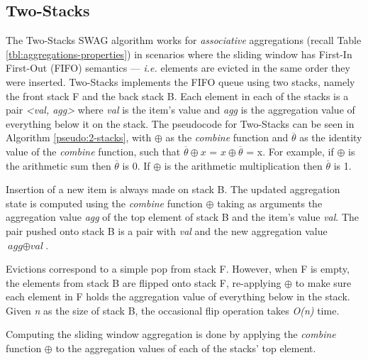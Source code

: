 \subsection{Two-Stacks} \label{sec:2stacks}
The Two-Stacks SWAG algorithm works for \textit{associative} aggregations (recall Table \ref{tbl:aggregations-properties}) in scenarios where the sliding window has First-In First-Out (FIFO) semantics --- \textit{i.e.} elements are evicted in the same order they were inserted. Two-Stacks \cite{Tangwongsan-DABA} implements the FIFO queue using two stacks, namely the front stack F and the back stack B. Each element in each of the stacks is a pair \textit{<val, agg>} where \textit{val} is the item's value and \textit{agg} is the aggregation value of everything below it on the stack. The pseudocode for Two-Stacks can be seen in Algorithm \ref{pseudo:2-stacks}, with $\oplus$ as the \textit{combine} function and $\overline{\theta}$ as the identity value of the \textit{combine} function, such that $\overline{\theta} \oplus x$ = $x \oplus \overline{\theta}$ = x. For example, if $\oplus$ is the arithmetic sum then $\overline{\theta}$ is 0. If $\oplus$ is the arithmetic multiplication then $\overline{\theta}$ is 1.

Insertion of a new item is always made on stack B. The updated aggregation state is computed using the \textit{combine} function $\oplus$ taking as arguments the aggregation value \textit{agg} of the top element of stack B and the item's value \textit{val}. The pair pushed onto stack B is a pair with \textit{val} and the new aggregation value $\textit{agg} \oplus \textit{val}$.

Evictions correspond to a simple pop from stack F. However, when F is empty, the elements from stack B are flipped onto stack F, re-applying $\oplus$ to make sure each element in F holds the aggregation value of everything below in the stack. Given \textit{n} as the size of stack B, the occasional flip operation takes \textit{O(n)} time.

Computing the sliding window aggregation is done by applying the \textit{combine} function $\oplus$ to the aggregation values of each of the stacks' top element. 

